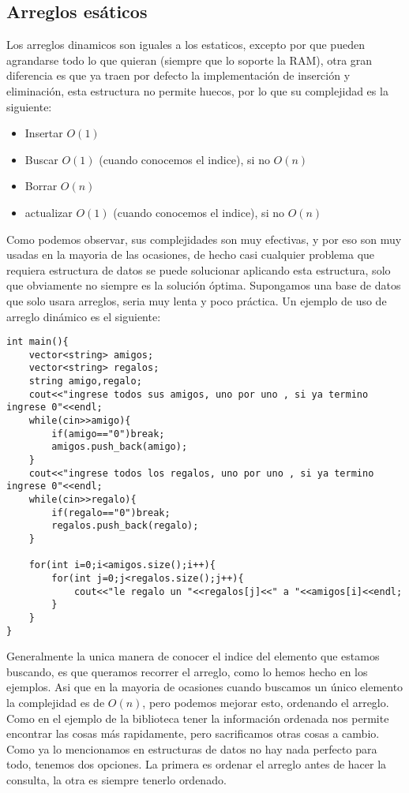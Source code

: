 \subsection{Arreglos esáticos}
Los arreglos dinamicos son iguales a los estaticos, excepto por que pueden agrandarse todo lo que quieran (siempre que lo soporte la RAM), otra gran diferencia es que ya traen por defecto la implementación de inserción y eliminación, esta estructura no permite huecos, por lo que su complejidad es la siguiente:
\begin{itemize}
    \item Insertar $O(1)$
    \item Buscar   $O(1)$ (cuando conocemos el indice), si no $O(n)$
    \item Borrar   $O(n)$ 
    \item actualizar $O(1)$ (cuando conocemos el indice), si no $O(n)$
\end{itemize}
Como podemos observar, sus complejidades son muy efectivas, y por eso son muy usadas en la mayoria de las ocasiones, de hecho casi cualquier problema que requiera estructura de datos se puede solucionar aplicando esta estructura, solo que obviamente no siempre es la solución óptima. Supongamos una base de datos que solo usara arreglos, seria muy lenta y poco práctica.
Un ejemplo de uso de arreglo dinámico es el siguiente:
\\\begin{minipage}{\textwidth}
\begin{lstlisting}[style=C,caption=arregloDinamicoAmigos.cpp]
int main(){
    vector<string> amigos;
    vector<string> regalos;
    string amigo,regalo;
    cout<<"ingrese todos sus amigos, uno por uno , si ya termino ingrese 0"<<endl;
    while(cin>>amigo){
        if(amigo=="0")break;
        amigos.push_back(amigo);
    }
    cout<<"ingrese todos los regalos, uno por uno , si ya termino ingrese 0"<<endl;
    while(cin>>regalo){
        if(regalo=="0")break;
        regalos.push_back(regalo);
    }

    for(int i=0;i<amigos.size();i++){
        for(int j=0;j<regalos.size();j++){
            cout<<"le regalo un "<<regalos[j]<<" a "<<amigos[i]<<endl;
        }
    }
}
\end{lstlisting}
\end{minipage}
Generalmente la unica manera de conocer el indice del elemento que estamos buscando, es que queramos recorrer el arreglo, como lo hemos hecho en los ejemplos. Asi que en la mayoria de ocasiones cuando buscamos un único elemento la complejidad es de $O(n)$, pero podemos mejorar esto, ordenando el arreglo. Como en el ejemplo de la biblioteca tener la información ordenada nos permite encontrar las cosas más rapidamente, pero sacrificamos otras cosas a cambio. Como ya lo mencionamos en estructuras de datos no hay nada perfecto para todo, tenemos dos opciones. La primera es ordenar el arreglo antes de hacer la consulta, la otra es siempre tenerlo ordenado.
